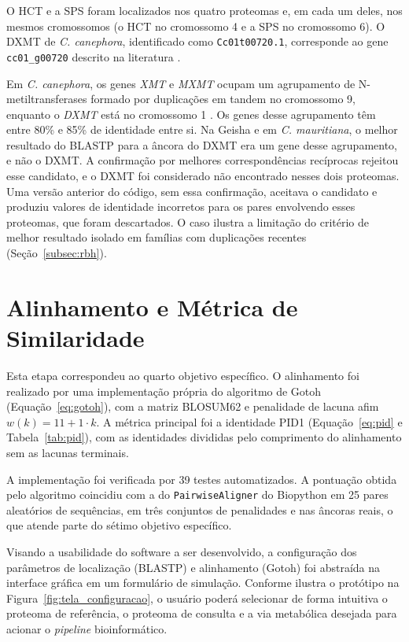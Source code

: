 O HCT e a SPS foram localizados nos quatro proteomas e, em cada um deles, nos mesmos cromossomos (o HCT no cromossomo 4 e a SPS no cromossomo 6). O DXMT de \textit{C. canephora}, identificado como \texttt{Cc01t00720.1}, corresponde ao gene \texttt{cc01\_g00720} descrito na literatura \cite{Denoeud2014, Raharimalala2021}.

Em \textit{C. canephora}, os genes \textit{XMT} e \textit{MXMT} ocupam um agrupamento de N-metiltransferases formado por duplicações em tandem no cromossomo 9, enquanto o \textit{DXMT} está no cromossomo 1 \cite{Raharimalala2021}. Os genes desse agrupamento têm entre 80\% e 85\% de identidade entre si. Na Geisha e em \textit{C. mauritiana}, o melhor resultado do BLASTP para a âncora do DXMT era um gene desse agrupamento, e não o DXMT. A confirmação por melhores correspondências recíprocas rejeitou esse candidato, e o DXMT foi considerado não encontrado nesses dois proteomas. Uma versão anterior do código, sem essa confirmação, aceitava o candidato e produziu valores de identidade incorretos para os pares envolvendo esses proteomas, que foram descartados. O caso ilustra a limitação do critério de melhor resultado isolado em famílias com duplicações recentes (Seção~\ref{subsec:rbh}).

\section{Alinhamento e Métrica de Similaridade}

Esta etapa correspondeu ao quarto objetivo específico. O alinhamento foi realizado por uma implementação própria do algoritmo de Gotoh (Equação~\ref{eq:gotoh}), com a matriz BLOSUM62 e penalidade de lacuna afim $w(k) = 11 + 1 \cdot k$. A métrica principal foi a identidade PID1 (Equação~\ref{eq:pid} e Tabela~\ref{tab:pid}), com as identidades divididas pelo comprimento do alinhamento sem as lacunas terminais.

A implementação foi verificada por 39 testes automatizados. A pontuação obtida pelo algoritmo coincidiu com a do \texttt{PairwiseAligner} do Biopython \cite{Cock2009} em 25 pares aleatórios de sequências, em três conjuntos de penalidades e nas âncoras reais, o que atende parte do sétimo objetivo específico.

Visando a usabilidade do software a ser desenvolvido, a configuração dos parâmetros de localização (BLASTP) e alinhamento (Gotoh) foi abstraída na interface gráfica em um formulário de simulação. Conforme ilustra o protótipo na Figura~\ref{fig:tela_configuracao}, o usuário poderá selecionar de forma intuitiva o proteoma de referência, o proteoma de consulta e a via metabólica desejada para acionar o \textit{pipeline} bioinformático.


